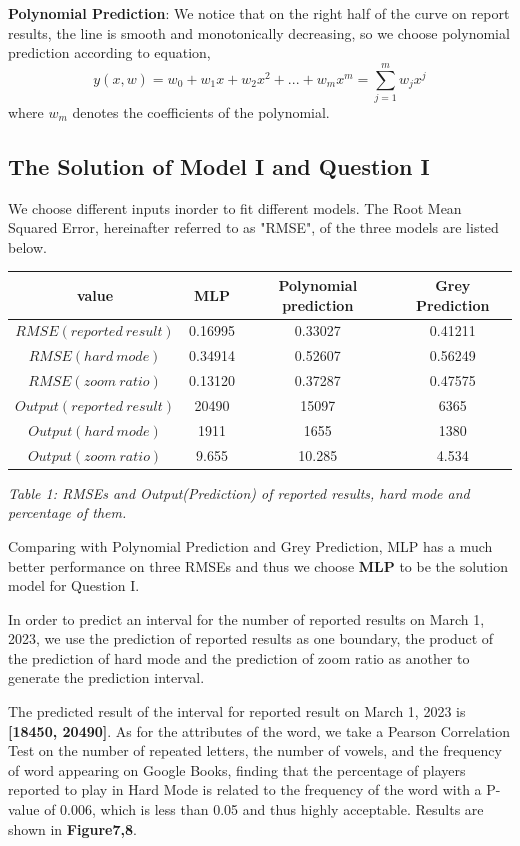\documentclass[12pt]{article}
\begin{document}
\textbf{Polynomial Prediction}: We notice that on the right half of the curve on report results, the line is smooth and monotonically decreasing, so we choose polynomial prediction according to equation,
\begin{equation*}
	y(x,w) = w_0 + w_1x + w_2x^2 + ... + w_mx^m = \sum_{j=1}^{m}w_jx^j
\end{equation*}
where $w_m$ denotes the coefficients of the polynomial.
\subsection{The Solution of Model I and Question I}
We choose different inputs inorder to fit different models. The Root Mean Squared Error, hereinafter referred to as "RMSE", of the three models are listed below.
\vspace{0.2cm}
\begin{center}
\begin{tabular}{c c c c}
\hline
value & MLP & Polynomial prediction & Grey Prediction\\
\hline
$RMSE(reported\ result)$&0.16995&0.33027&0.41211\\
$RMSE(hard\ mode)$&0.34914&0.52607&0.56249\\
$RMSE(zoom\ ratio)$&0.13120&0.37287&0.47575\\
\hline
$Output(reported\ result)$&20490&15097&6365\\
$Output(hard\ mode)$&1911&1655&1380\\
$Output(zoom\ ratio)$&9.655&10.285&4.534\\
\hline
\end{tabular}
\vspace{0.2cm}
\end{center}

\textit{Table 1: RMSEs and Output(Prediction) of reported results, hard mode and percentage of them.}
\vspace{0.5cm}

Comparing with Polynomial Prediction and Grey Prediction, MLP has a much better performance on three RMSEs and thus we choose \textbf{MLP} to be the solution model for Question I.


In order to predict an interval for the number of reported results on March 1, 2023, we use the prediction of reported results as one boundary, the product of the prediction of hard mode and the prediction of zoom ratio as another to generate the prediction interval.

The predicted result of the interval for reported result on March 1, 2023 is \textbf{[18450, 20490]}. As for the attributes of the word, we take a Pearson Correlation Test on the number of repeated letters, the number of vowels, and the frequency of word appearing on Google Books, finding that the percentage of players reported to play in Hard Mode is related to the frequency of the word with a P-value of 0.006, which is less than 0.05 and thus highly acceptable. Results are shown in  \textbf{Figure7,8}.
\end{document}
